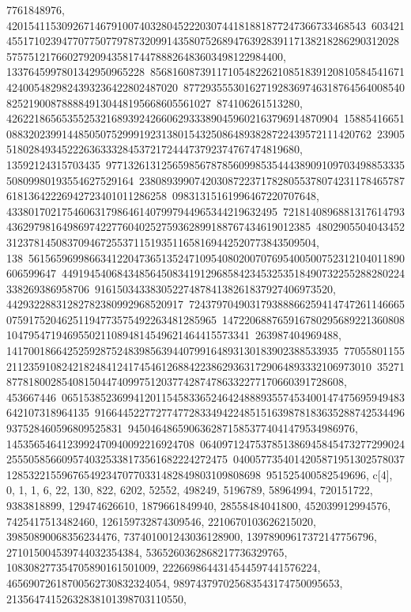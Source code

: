 {{{7761848976, 42015411530926714679100740328045222030744181881877247366733468543\
60342145517102394770775077978732099143580752689476392839117138218286290312028\
57575121766027920943581744788826483603498122984400, 1337645997801342950965228\
85681608739117105482262108518391208105845416714240054829824393236422802487020\
87729355530162719283697463187645640085408252190087888849130448195668605561027\
874106261513280, 426221865653552532168939242660629333890459602163796914870904\
15885416651088320239914485050752999192313801543250864893828722439572111420762\
2390551802849345222636333284537217244473792374767474819680, 13592124315703435\
97713261312565985678785609985354443890910970349885333550809980193554627529164\
23808939907420308722371782805537807423117846578761813642226942723401011286258\
09831315161996467220707648, 4338017021754606317986461407997944965344219632495\
72181408968813176147934362979816498697422776040252759362899188767434619012385\
480290550404345231237814508370946725537115193511658169442520773843509504, 138\
56156596998663412204736513524710954080200707695400500752312104011890606599647\
44919454068434856450834191296858423453253518490732255288280224338269386958706\
9161503433830522748784138261837927406973520, 44293228831282782380992968520917\
72437970490317938886625941474726114666507591752046251194773575492263481285965\
14722068876591678029568922136080810479547194695502110894814549621464415573341\
263987404969488, 141700186642525928752483985639440799164893130183902388533935\
77055801155211235910824218248412417454612688422386293631729064893332106973010\
352718778180028540815044740997512037742874786332277170660391728608, 453667446\
06515385236994120115458336524642488893557453400147475695949483642107318964135\
91664452277277477283349422485151639878183635288742534496937528460596809525831\
94504648659063628715853774041479534986976, 1453565464123992470940092216924708\
06409712475378513869458454732772990242555058566095740325338173561682224272475\
04005773540142058719513025780371285322155967654923470770331482849803109808698\
951525400582549696}}, {c[4], {0, 1, 1, 6, 22, 130, 822, 6202, 52552, 498249, 
   5196789, 58964994, 720151722, 9383818899, 129474626610, 1879661849940, 
   28558484041800, 452039912994576, 7425417513482460, 126159732874309546, 
   2210670103626215020, 39850890068356234476, 737401001243036128900, 
   13978909617372147756796, 271015004539744032354384, 
   5365260362868217736329765, 108308277354705890161501009, 
   2226698644314544597441576224, 46569072618700562730832324054, 
   989743797025683543174750095653, 21356474152632838101398703110550, 
}}}
